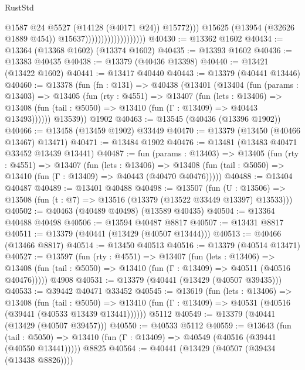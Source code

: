 \begin{lexlean}{RustStd}
\begin{coremodule}
                                                @1587
                                                @24
                                                @5527
                                                (@14128 (@40171 @24))
                                                @15772)))
                                          @15625
                                          (@13954 (@32626 @1889 @454))
                                          @15637)))))))))))))))))))
@40430 := @13362 @1602
@40434 := @13364 (@13368 @1602) (@13374 @1602)
@40435 := @13393 @1602
@40436 := @13383 @40435
@40438 := @13379 (@40436 @13398)
@40440 := @13421 (@13422 @1602)
@40441 := @13417 @40440
@40443 := @13379 (@40441 @13446)
@40460 := @13378
    (fun (fn : @131) =>
    @40438
      (@13401
        (@13404
          (fun (params : @13403) =>
          @13405
            (fun (rty : @4551) =>
            @13407
              (fun (lets : @13406) =>
              @13408 (fun (tail : @5050) => @13410 (fun (Γ : @13409) => @40443 @13493))))))
        @13539))
    @1902
@40463 := @13545 (@40436 (@13396 @1902))
@40466 := @13458 (@13459 @1902) @33449
@40470 := @13379 (@13450 (@40466 @13467) @13471)
@40471 := @13484 @1902
@40476 := @13481 (@13483 @40471 @33452 @13439 @13441)
@40487 := fun (params : @13403) =>
  @13405
    (fun (rty : @4551) =>
    @13407
      (fun (lets : @13406) =>
      @13408 (fun (tail : @5050) => @13410 (fun (Γ : @13409) => @40443 (@40470 @40476)))))
@40488 := @13404 @40487
@40489 := @13401 @40488
@40498 := @13507
    (fun (U : @13506) => @13508 (fun (t : @7) => @13516 (@13379 (@13522 @33449 @13397) @13533)))
@40502 := @40463 (@40489 @40498) (@13589 @40435)
@40504 := @13364 @40488 @40498
@40506 := @13594 @40487 @8817
@40507 := @13431 @8817
@40511 := @13379 (@40441 (@13429 (@40507 @13444)))
@40513 := @40466 (@13466 @8817)
@40514 := @13450 @40513
@40516 := @13379 (@40514 @13471)
@40527 := @13597
    (fun (rty : @4551) =>
    @13407
      (fun (lets : @13406) =>
      @13408 (fun (tail : @5050) => @13410 (fun (Γ : @13409) => @40511 (@40516 @40476)))))
    @4908
@40531 := @13379 (@40441 (@13429 (@40507 @39435)))
@40533 := @39442 @40471 @33452
@40545 := @13619
    (fun (lets : @13406) =>
    @13408
      (fun (tail : @5050) =>
      @13410 (fun (Γ : @13409) => @40531 (@40516 (@39441 (@40533 @13439 @13441))))))
    @5112
@40549 := @13379 (@40441 (@13429 (@40507 @39457)))
@40550 := @40533 @5112
@40559 := @13643
    (fun (tail : @5050) => @13410 (fun (Γ : @13409) => @40549 (@40516 (@39441 (@40550 @13441)))))
    @8825
@40564 := @40441 (@13429 (@40507 (@39434 (@13438 @8826))))

\end{coremodule}
\end{lexlean}

